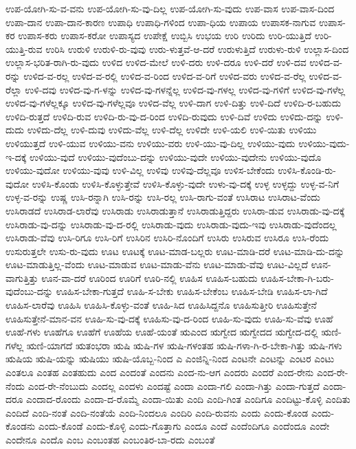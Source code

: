 {ಉಪ-ಯೋಗಿ-ಸು-ವ-ವನು
ಉಪ-ಯೋಗಿ-ಸು-ವು-ದಿಲ್ಲ
ಉಪ-ಯೋಗಿ-ಸು-ವುದು
ಉಪ-ವಾಸ
ಉಪ-ವಾಸ-ದಿಂದ
ಉಪಾ-ದಾನ
ಉಪಾ-ದಾನ-ಕಾರಣ
ಉಪಾಧಿ
ಉಪಾಧಿ-ಗಳಿಂದ
ಉಪಾ-ಧಿಯ
ಉಪಾಯ
ಉಪಾಸಕ-ನಾಗುವ
ಉಪಾಸ-ಕರ
ಉಪಾಸ-ಕರು
ಉಪಾಸ-ಕರೋ
ಉಪಾಸ್ಯದ
ಉಪೇಕ್ಷೆ
ಉಬ್ಬಿಸಿ
ಉಭಯ
ಉರಿ
ಉರಿದು
ಉರಿ-ಯುತ್ತಿದೆ
ಉರಿ-ಯುತ್ತಿ-ರುವ
ಉರಿಸಿ
ಉರುಳಿ
ಉರುಳಿ-ರು-ವುವು
ಉರು-ಳುತ್ತವೆ-ಆ-ದರೆ
ಉರುಳುತ್ತಿದೆ
ಉರುಳು-ರುಳಿ
ಉಲ್ಲಾಸ-ದಿಂದ
ಉಲ್ಲಾಸ-ಭರಿತ-ರಾಗಿ-ರು-ವುದು
ಉಳಿದ
ಉಳಿದ-ಮೇಲೆ
ಉಳಿ-ದರು
ಉಳಿ-ದರೂ
ಉಳಿ-ದರೆ
ಉಳಿ-ದವ
ಉಳಿದ-ವ-ರನ್ನು
ಉಳಿದ-ವ-ರಲ್ಲ
ಉಳಿದ-ವ-ರಲ್ಲಿ
ಉಳಿದ-ವ-ರಿಂದ
ಉಳಿದ-ವ-ರಿಗೆ
ಉಳಿದ-ವರು
ಉಳಿದ-ವ-ರೆಲ್ಲ
ಉಳಿದ-ವ-ರೆಲ್ಲಾ
ಉಳಿ-ದವು
ಉಳಿದ-ವು-ಗ-ಳನ್ನು
ಉಳಿದ-ವು-ಗಳನ್ನೆಲ್ಲ
ಉಳಿದ-ವು-ಗಳಲ್ಲ
ಉಳಿದ-ವು-ಗಳಿಗೆ
ಉಳಿದ-ವು-ಗಳೆಲ್ಲ
ಉಳಿದ-ವು-ಗಳೆಲ್ಲಕ್ಕೂ
ಉಳಿದ-ವು-ಗಳೆಲ್ಲವೂ
ಉಳಿದ-ವೆಲ್ಲ
ಉಳಿ-ದಾಗ
ಉಳಿ-ದಿತ್ತು
ಉಳಿ-ದಿದೆ
ಉಳಿದಿ-ರ-ಬಹುದು
ಉಳಿದಿ-ರುತ್ತದೆ
ಉಳಿದಿ-ರುವ
ಉಳಿದಿ-ರು-ವು-ದ-ರಿಂದ
ಉಳಿದಿ-ರುವುದು
ಉಳಿ-ದಿವೆ
ಉಳಿದು
ಉಳಿದು-ದನ್ನು
ಉಳಿ-ದುದು
ಉಳಿದು-ದೆಲ್ಲ
ಉಳಿ-ದುವು
ಉಳಿದು-ವೆಲ್ಲ
ಉಳಿ-ದೆಲ್ಲ
ಉಳಿದೇ
ಉಳಿ-ಯಲಿ
ಉಳಿ-ಯಿತು
ಉಳಿಯು
ಉಳಿಯುತ್ತದೆ
ಉಳಿ-ಯುವ
ಉಳಿಯು-ವನು
ಉಳಿಯು-ವರು
ಉಳಿ-ಯು-ವು-ದಿಲ್ಲ
ಉಳಿಯು-ವುದು
ಉಳಿಯು-ವುದು-ಇ-ದಕ್ಕೆ
ಉಳಿಯು-ವುದೆ
ಉಳಿಯು-ವುದೆಂಬು-ದನ್ನು
ಉಳಿಯು-ವುದೇ
ಉಳಿಯು-ವುದೇನು
ಉಳಿಯು-ವುದೊ
ಉಳಿಯು-ವುದೋ
ಉಳಿಯು-ವುವು
ಉಳಿ-ವಿಲ್ಲ
ಉಳಿವು
ಉಳಿವು-ದೆಲ್ಲವೂ
ಉಳಿಸ-ಬೇಕೆಂದು
ಉಳಿಸಿ-ಕೊಂಡಿ-ರು-ವುದೋ
ಉಳಿಸಿ-ಕೊಂಡು
ಉಳಿಸಿ-ಕೊಳ್ಳುತ್ತೇವೆ
ಉಳಿಸಿ-ಕೊಳ್ಳು-ವುದೇ
ಉಳು-ವು-ದಕ್ಕೆ
ಉಳ್ಳ
ಉಳ್ಳದ್ದು
ಉಳ್ಳ-ವ-ನಿಗೆ
ಉಳ್ಳ-ವ-ರನ್ನು
ಉಷ್ಣ
ಉಸಿ-ರನ್ನಾಗಿ
ಉಸಿ-ರನ್ನು
ಉಸಿ-ರಲ್ಲ
ಉಸಿ-ರಾಗು-ವಂತೆ
ಉಸಿರಾಟ
ಉಸಿರಾಟ-ವೆಂದು
ಉಸಿರಾಡದೆ
ಉಸಿರಾಡ-ಲಾರೆವು
ಉಸಿರಾಡು
ಉಸಿರಾಡುತ್ತಾನೆ
ಉಸಿರಾಡುತ್ತಿದ್ದರು
ಉಸಿರಾ-ಡುವ
ಉಸಿರಾಡು-ವು-ದಕ್ಕೆ
ಉಸಿರಾಡು-ವು-ದನ್ನು
ಉಸಿರಾಡು-ವು-ದ-ರಲ್ಲಿ
ಉಸಿರಾಡು-ವುದು
ಉಸಿರಾಡು-ವುದು-ಇವು
ಉಸಿರಾಡು-ವುದೆಂದಲ್ಲ
ಉಸಿರಾಡು-ವೆವು
ಉಸಿ-ರಿಗೂ
ಉಸಿ-ರಿಗೆ
ಉಸಿರಿನ
ಉಸಿರಿ-ನೊಂದಿಗೆ
ಉಸಿರು
ಉಸಿರುವ
ಉಸಿರೂ
ಉಸಿ-ರೆಂದು
ಉಸುರುತ್ತಲೇ
ಉಸು-ರು-ವುದು
ಊಟ
ಊಟಕ್ಕೆ
ಊಟ-ಮಾಡ-ಬಲ್ಲರು
ಊಟ-ಮಾಡಿ-ದರೆ
ಊಟ-ಮಾಡಿ-ದು-ದನ್ನು
ಊಟ-ಮಾಡುತ್ತಿಲ್ಲ-ವೆಂದು
ಊಟ-ಮಾಡುವ
ಊಟ-ಮಾಡು-ವೆನು
ಊಟ-ಮಾಡು-ವೆವು
ಊಟ-ವಿಲ್ಲದೆ
ಊನ-ವಾಗುತ್ತಿತ್ತು
ಊನ-ವಾ-ದರೆ
ಊರಿಂದ
ಊರಿಗೆ
ಊರಿ-ನಲ್ಲಿ
ಊಹಿಸ
ಊಹಿಸ-ಬಹುದು
ಊಹಿಸ-ಬೇಕಾ-ಗಿ-ಬರು-ವುದೆಂಬು-ದನ್ನು
ಊಹಿಸ-ಬೇಕಾ-ಗುತ್ತದೆ
ಊಹಿ-ಸ-ಬೇಕು
ಊಹಿಸ-ಬೇಕೆಂಬ
ಊಹಿಸ-ಬೇಡಿ
ಊಹಿಸ-ಲಾ-ಗಿದೆ
ಊಹಿಸ-ಲಾರೆವು
ಊಹಿಸಿ
ಊಹಿಸಿ-ಕೊಳ್ಳು-ವಂತೆ
ಊಹಿ-ಸಿದ
ಊಹಿಸಿದ್ದನೊ
ಊಹಿಸುತ್ತೀರಿ
ಊಹಿಸುತ್ತೇನೆ
ಊಹಿಸುತ್ತೇನೆ-ಮಾನ-ವನ
ಊಹಿ-ಸು-ವು-ದಕ್ಕೆ
ಊಹಿಸು-ವು-ದ-ರಿಂದ
ಊಹಿ-ಸು-ವುದು
ಊಹಿ-ಸು-ವೆವು
ಊಹೆ
ಊಹೆ-ಗಳು
ಊಹೆಗೂ
ಊಹೆಗೆ
ಊಹೆಯ
ಊಹೆ-ಯಂತೆ
ಋಎಂದ
ಋಗ್ವೇದ
ಋಗ್ವೇದದ
ಋಗ್ವೇದ-ದಲ್ಲಿ
ಋಣಿ-ಗಳೆಲ್ಲ
ಋಣಿ-ಯಾಗದೆ
ಋತಂಭರಾ
ಋಷಿ
ಋಷಿ-ಗಳ
ಋಷಿ-ಗಳಂತಹ
ಋಷಿ-ಗಳಾ-ಗಿ-ರ-ಬೇಕಾ-ಗಿತ್ತು
ಋಷಿ-ಗಳು
ಋಷಿಯ
ಋಷಿ-ಯನ್ನು
ಋಷಿಯು
ಋಷಿ-ಯೊಬ್ಬ-ನಿಂದ
ಎ
ಎಂಜಿನ್ನಿ-ನಿಂದ
ಎಂಟನೇ
ಎಂಟನ್ನು
ಎಂಟರ
ಎಂಟು
ಎಂತಲೂ
ಎಂತಹ
ಎಂತಹುದು
ಎಂದ
ಎಂದಂತೆ
ಎಂದನು
ಎಂದ-ನು-ಆಗ
ಎಂದರು
ಎಂದರೆ
ಎಂದ-ರೇನು
ಎಂದ-ರೇ-ನೆಂದು
ಎಂದ-ರೇ-ನೆಂಬುದು
ಎಂದಲ್ಲ
ಎಂದಳು
ಎಂದಷ್ಟೆ
ಎಂದಾ
ಎಂದಾ-ಗಲಿ
ಎಂದಾ-ಗಿತ್ತು
ಎಂದಾ-ಗುತ್ತದೆ
ಎಂದಾ-ದರೂ
ಎಂದಾದ-ರೊಂದು
ಎಂದಾ-ದ-ರೊಮ್ಮೆ
ಎಂದಾ-ಯಿತು
ಎಂದಿ
ಎಂದಿ-ಗಿಂತ
ಎಂದಿಗೂ
ಎಂದಿಟ್ಟು-ಕೊಳ್ಳಿ
ಎಂದಿತು
ಎಂದಿದೆ
ಎಂದಿ-ನಂತೆ
ಎಂದಿ-ನಂತೆಯೆ
ಎಂದಿ-ನಿಂದಲೂ
ಎಂದಿರಿ
ಎಂದಿ-ರುವನು
ಎಂದು
ಎಂದು-ಕೊಂಡ
ಎಂದು-ಕೊಂಡನು
ಎಂದು-ಕೊಂಡೆ
ಎಂದು-ಕೊಳ್ಳಿ
ಎಂದು-ಗೊತ್ತಾಗು
ಎಂದೂ
ಎಂದೆ
ಎಂದೆಂದಿಗೂ
ಎಂದೆಂದೂ
ಎಂದೇ
ಎಂದೇನೂ
ಎಂದೊ
ಎಂಬ
ಎಂಬಂತಹ
ಎಂಬಂತಿರ-ಬಾ-ರದು
ಎಂಬಂತೆ
}
